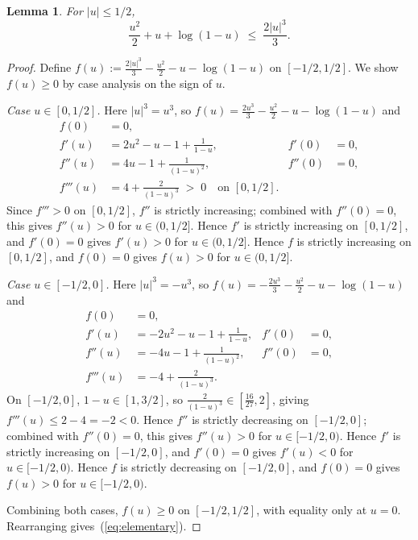 \documentclass{article} %
\newtheorem{lemma}[theorem]{Lemma}
\def\eqref#1{equation~\ref{#1}}
\renewcommand{\eqref}[1]{\textup{(\ref{#1})}}
\begin{document}
\begin{lemma}
\label{lem:elementary}
For $|u| \le 1/2$,
\begin{equation}
\frac{u^2}{2} + u + \log(1 - u) \;\le\; \frac{2|u|^3}{3}.
\label{eq:elementary}
\end{equation}
\end{lemma}

\begin{proof}
Define $f(u) := \frac{2|u|^3}{3} - \frac{u^2}{2} - u - \log(1-u)$ on
$[-1/2, 1/2]$. We show $f(u) \ge 0$ by case analysis on the sign of $u$.

\emph{Case $u \in [0, 1/2]$.} Here $|u|^3 = u^3$, so
$f(u) = \tfrac{2u^3}{3} - \tfrac{u^2}{2} - u - \log(1-u)$ and
\begin{align*}
f(0) &= 0, \\
f'(u) &= 2u^2 - u - 1 + \tfrac{1}{1-u}, & f'(0) &= 0, \\
f''(u) &= 4u - 1 + \tfrac{1}{(1-u)^2}, & f''(0) &= 0, \\
f'''(u) &= 4 + \tfrac{2}{(1-u)^3} \;>\; 0 \quad \text{on } [0, 1/2].
\end{align*}
Since $f''' > 0$ on $[0, 1/2]$, $f''$ is strictly increasing; combined
with $f''(0) = 0$, this gives $f''(u) > 0$ for $u \in (0, 1/2]$. Hence
$f'$ is strictly increasing on $[0, 1/2]$, and $f'(0) = 0$ gives
$f'(u) > 0$ for $u \in (0, 1/2]$. Hence $f$ is strictly increasing on
$[0, 1/2]$, and $f(0) = 0$ gives $f(u) > 0$ for $u \in (0, 1/2]$.

\emph{Case $u \in [-1/2, 0]$.} Here $|u|^3 = -u^3$, so
$f(u) = -\tfrac{2u^3}{3} - \tfrac{u^2}{2} - u - \log(1-u)$ and
\begin{align*}
f(0) &= 0, \\
f'(u) &= -2u^2 - u - 1 + \tfrac{1}{1-u}, & f'(0) &= 0, \\
f''(u) &= -4u - 1 + \tfrac{1}{(1-u)^2}, & f''(0) &= 0, \\
f'''(u) &= -4 + \tfrac{2}{(1-u)^3}.
\end{align*}
On $[-1/2, 0]$, $1 - u \in [1, 3/2]$, so
$\tfrac{2}{(1-u)^3} \in [\tfrac{16}{27}, 2]$, giving
$f'''(u) \le 2 - 4 = -2 < 0$. Hence $f''$ is strictly decreasing on
$[-1/2, 0]$; combined with $f''(0) = 0$, this gives $f''(u) > 0$ for
$u \in [-1/2, 0)$. Hence $f'$ is strictly increasing on $[-1/2, 0]$,
and $f'(0) = 0$ gives $f'(u) < 0$ for $u \in [-1/2, 0)$. Hence $f$ is
strictly decreasing on $[-1/2, 0]$, and $f(0) = 0$ gives $f(u) > 0$
for $u \in [-1/2, 0)$.

Combining both cases, $f(u) \ge 0$ on $[-1/2, 1/2]$, with equality only
at $u = 0$. Rearranging gives~\eqref{eq:elementary}.
\end{proof}
\end{document}
